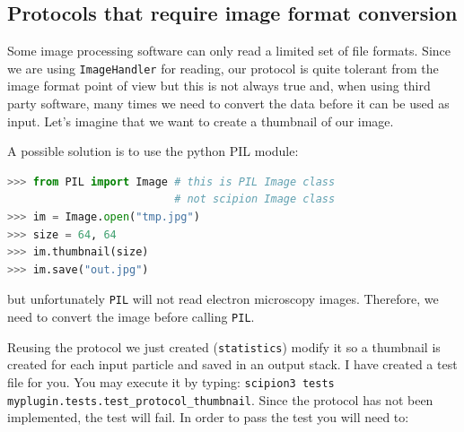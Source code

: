 \documentclass[12pt]{article} %
\newcommand{\ttt}[1]{\texttt{#1}}
\begin{document}
\subsection{Protocols that require image format conversion}
Some image processing software can only read a limited set of file formats.
Since we are using \ttt{ImageHandler} for reading, our protocol is quite tolerant from the image format point of view
but this is not always true and, when using third party software, many times we need to convert the data before it can be 
used as input. Let's imagine that we want to create a thumbnail of our image. 

A possible solution is to use the python PIL module:

\begin{lstlisting}[language=Python, caption={The following script creates  64x64 thumbnails using PIL.}, label={lst:PIL}]
>>> from PIL import Image # this is PIL Image class 
                          # not scipion Image class
>>> im = Image.open("tmp.jpg")
>>> size = 64, 64
>>> im.thumbnail(size)
>>> im.save("out.jpg")
\end{lstlisting}
but unfortunately \ttt{PIL} will not read electron microscopy images. Therefore, we need to convert the image
before calling \ttt{PIL}. 

Reusing the protocol we just created (\ttt{statistics}) modify it so a thumbnail is created for each input particle and saved in an output stack. I have created a test file for you. You may execute it by typing: \ttt{scipion3 tests myplugin.tests.test\_protocol\_thumbnail}. Since the protocol has not been implemented, the test will fail. In order to pass the test you will need to:
\end{document}
